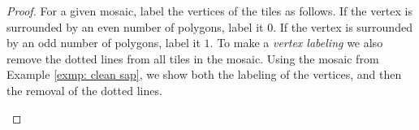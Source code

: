 \documentclass[12pt]{article}
\theoremstyle{plain}
\theoremstyle{definition}
\theoremstyle{remark}
\theoremstyle{definition}
\newcommand{\cell}[4]{ \draw[thick] ( #1 , #2 ) rectangle ( #3 , #4 );}
\newcommand{\cellA}[4]{ \draw[thick] ( #1 , #2 ) rectangle ( #3 , #4 ); \draw[red, thick, densely dotted] (#3 * 0.5 + #1 * 0.5 , #2) -- (#3, #4 * 0.5 + #2 * 0.5);}
\newcommand{\cellB}[4]{ \draw[thick] ( #1 , #2 ) rectangle ( #3 , #4 ); \draw[red, thick, densely dotted] (#3 * 0.5 + #1 * 0.5 , #2) -- (#1, #4 * 0.5 + #2 * 0.5);}
\newcommand{\cellC}[4]{ \draw[thick] ( #1 , #2 ) rectangle ( #3 , #4 ); \draw[red, thick, densely dotted] (#3 * 0.5 + #1 * 0.5 , #4) -- (#1, #4 * 0.5 + #2 * 0.5);}
\newcommand{\cellD}[4]{ \draw[thick] ( #1 , #2 ) rectangle ( #3 , #4 ); \draw[red, thick, densely dotted] (#3 * 0.5 + #1 * 0.5 , #4) -- (#3, #4 * 0.5 + #2 * 0.5);}
\newcommand{\cellE}[4]{ \draw[thick] ( #1 , #2 ) rectangle ( #3 , #4 ); \draw[red, thick, densely dotted] (#3 * 0.5 + #1 * 0.5 , #2) -- (#3 * 0.5 + #1 * 0.5 , #4);}
\newcommand{\cellF}[4]{ \draw[thick] ( #1 , #2 ) rectangle ( #3 , #4 ); \draw[red, thick, densely dotted] (#3, #4 * 0.5 + #2 * 0.5) -- (#1, #4 * 0.5 + #2 * 0.5);}
\newcommand{\lablvertex}[3]{\node[shape=circle,draw=none,fill=white, inner sep=2pt,minimum size=5pt] (A) at ( #1 , #2 ) {#3};}
\begin{document}
\begin{proof}

For a given mosaic, label the vertices of the tiles as follows. If the vertex is surrounded by an even number of polygons, label it $0$. If the vertex is surrounded by an odd number of polygons, label it $1$. To make a \textit{vertex labeling} we also remove the dotted lines from all tiles in the mosaic. Using the mosaic from Example \ref{exmp: clean sap}, we show both the labeling of the vertices, and then the removal of the dotted lines.

\begin{center}
\end{center}
\end{proof}
\end{document}
